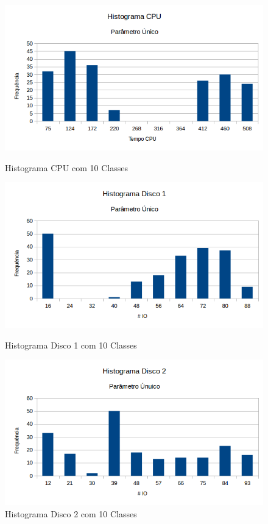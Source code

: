 \documentclass[11pt,a4paper,openany,oneside]{abntex2}
\begin{document}
\begin{figure}[H]
	\begin{minipage}[b]{0.45\linewidth}
		\centering
		\includegraphics[width=\textwidth]{histogramacpu.png}
		\caption{Histograma CPU com 10 Classes}
		\label{fig:histocpu}
	\end{minipage}
	\hspace{0.5cm}
	\begin{minipage}[b]{0.45\linewidth}
		\centering
		\includegraphics[width=\textwidth]{histogranadsico.png}
		\caption{Histograma Disco 1 com 10 Classes}
		\label{fig:histod1}
	\end{minipage}
	\hspace{0.5cm}
	\begin{minipage}[t]{0.45\linewidth}
		\centering
		\includegraphics[width=\textwidth]{histogramadsic2.png}
		\caption{Histograma Disco 2 com 10 Classes}
		\label{fig:histod2}
	\end{minipage}
		
\end{figure}
\end{document}
